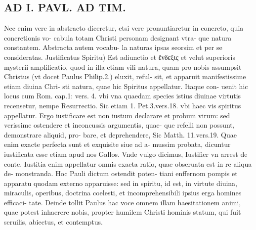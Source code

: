 \documentclass{article}
\begin{document}
\begin{pages}
\section*{AD I. PAVL. AD TIM. }
\marginpar{[ p.180 ]}\pstart Nec enim vere in abstracto diceretur, etsi vere pronuntiaretur in concreto, quia concretionis vo- cabula totam Christi personam designant vtra- que natura constantem. Abstracta autem vocabu- la naturas ipsas seorsim et per se consideratas.  \pend\pstart Justificatus Spiritu) Est adiunctio et ἔνδεξις et velut superioris mysterii amplificatio, quod in illa etiam vili natura, quam pro nobis assumpsit Christus (vt docet Paulus Philip.2.) eluxit, reful- sit, et apparuit manifestissime etiam diuina Chri- sti natura, quae hic Spiritus appellatur. Itaque con- uenit hic locus cum Rom. cap.1: vers. 4. vbi vna quaedam species istius diuinae virtutis recensetur, nempe Resurrectio. Sic etiam 1. Pet.3.vers.18. vbi haec vis spiritus appellatur. Ergo iustificare est non iustum declarare et probum virum: sed verissime ostendere et inconcussis argumentis, quae- que refelli non possunt, demonstrare aliquid, pro- bare, et deprehendere, Sic Matth. 11.vers.19. Quae enim exacte perfecta sunt et exquisite siue ad a- mussim probata, dicuntur iustificata esse etiam apud nos Gallos. Vnde vulgo dicimus, Iustifier vn arrest de conte. Iustitia enim appellatur omnis exacta ratio, quae obseruata est in re aliqua de- monstranda. Hoc Pauli dictum ostendit poten- tiani enffernom pompis et apparatu quodam externo apparuisse: sed in spiritu, id est, in virtute diuina, miraculis, operibus, doctrina coelesti, et incomprehensibili ipsius erga homines efficaci- tate. Deinde tollit Paulus hac voce omnem illam haesitationem animi, quae potest inhaerere nobis, propter humilem Christi hominis statum, qui fuit seruilis, abiectus, et contemptus.  \pend

\end{pages}
\end{document}
